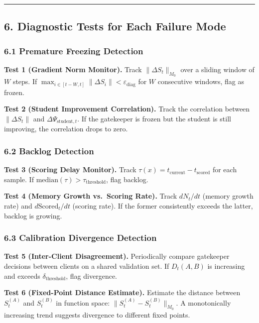 \documentclass[
  12pt,
]{article}
\begin{document}
\begin{center}\rule{0.5\linewidth}{0.5pt}\end{center}

\subsection{6. Diagnostic Tests for Each Failure
Mode}\label{diagnostic-tests-for-each-failure-mode}

\subsubsection{6.1 Premature Freezing
Detection}\label{premature-freezing-detection}

\textbf{Test 1 (Gradient Norm Monitor).} Track \(\|\Delta S_t\|_{M_0}\)
over a sliding window of \(W\) steps. If
\(\max_{i \in [t-W, t]} \|\Delta S_i\| < \varepsilon_{\text{diag}}\) for
\(W\) consecutive windows, flag as frozen.

\textbf{Test 2 (Student Improvement Correlation).} Track the correlation
between \(\|\Delta S_t\|\) and \(\Delta \Psi_{\text{student}, t}\). If
the gatekeeper is frozen but the student is still improving, the
correlation drops to zero.

\subsubsection{6.2 Backlog Detection}\label{backlog-detection}

\textbf{Test 3 (Scoring Delay Monitor).} Track
\(\tau(x) = t_{\text{current}} - t_{\text{scored}}\) for each sample. If
\(\text{median}(\tau) > \tau_{\text{threshold}}\), flag backlog.

\textbf{Test 4 (Memory Growth vs.~Scoring Rate).} Track \(dN_t/dt\)
(memory growth rate) and \(d\text{Scored}_t/dt\) (scoring rate). If the
former consistently exceeds the latter, backlog is growing.

\subsubsection{6.3 Calibration Divergence
Detection}\label{calibration-divergence-detection}

\textbf{Test 5 (Inter-Client Disagreement).} Periodically compare
gatekeeper decisions between clients on a shared validation set. If
\(D_t(A, B)\) is increasing and exceeds \(\delta_{\text{threshold}}\),
flag divergence.

\textbf{Test 6 (Fixed-Point Distance Estimate).} Estimate the distance
between \(S_t^{(A)}\) and \(S_t^{(B)}\) in function space:
\(\|S_t^{(A)} - S_t^{(B)}\|_{M_0}\). A monotonically increasing trend
suggests divergence to different fixed points.
\end{document}
